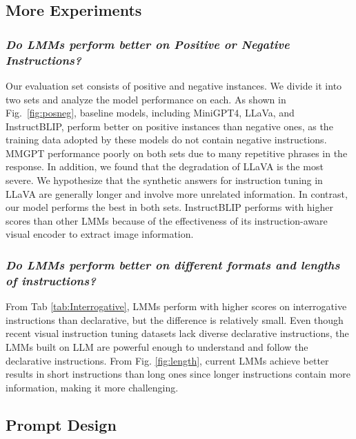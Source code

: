 \subsection{More Experiments}
\subsubsection{\textit{Do LMMs perform better on Positive or Negative Instructions? }}
Our evaluation set consists of positive and negative instances. We divide it into two sets and analyze the model performance on each. As shown in Fig.~\ref{fig:posneg}, baseline models, including MiniGPT4, LLaVa, and InstructBLIP,  perform better on positive instances than negative ones, as the training data adopted by these models do not contain negative instructions. MMGPT performance poorly on both sets due to many repetitive phrases in the response. In addition, we found that the degradation of LLaVA is the most severe. We hypothesize that the synthetic answers for instruction tuning in LLaVA are generally longer and involve more unrelated information. In contrast, our model performs the best in both sets. InstructBLIP performs with higher scores than other LMMs because of the effectiveness of its instruction-aware visual encoder to extract image information.





\subsubsection{\textit{Do LMMs perform better on different formats and lengths of instructions? }}

From Tab \ref{tab:Interrogative}, LMMs perform with higher scores on interrogative instructions than declarative, but the difference is relatively small. Even though recent visual instruction tuning datasets lack diverse declarative instructions, the LMMs built on LLM are powerful enough to understand and follow the declarative instructions. From Fig. \ref{fig:length}, current LMMs achieve better results in short instructions than long ones since longer instructions contain more information, making it more challenging. 

\subsection{Prompt Design}
